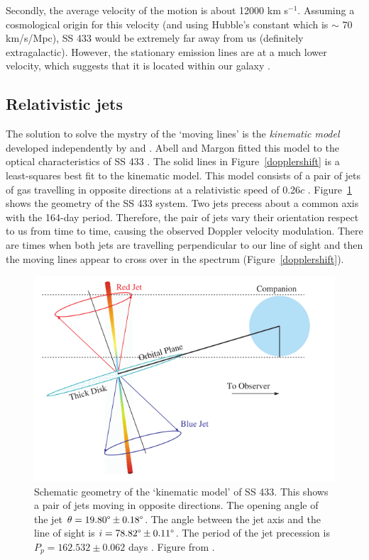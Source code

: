 Secondly, the average velocity of the motion is about 12000 km s$^{-1}$. Assuming a cosmological origin for this velocity (and using Hubble's constant which is $\sim$ 70 km/s/Mpc), SS 433 would be extremely far away from us (definitely extragalactic). However, the stationary emission lines are at a much lower velocity, which suggests that it is located within our galaxy \citep{seward_charles_2010}. 

\subsection{Relativistic jets}
The solution to solve the mystry of the `moving lines' is the \textit{kinematic model}
developed independently by \cite{Fabian1979} and \cite{Milgrom1979}. Abell and Margon fitted this model to the optical characteristics of SS 433 \citep{Margon1979}. The solid lines in Figure~\ref{dopplershift} is a least-squares best fit to the kinematic model. This model consists of a pair of jets of gas travelling in opposite directions at a relativistic speed of 0.26$c$ \citep{Margon1979}. Figure~\ref{geomtry_ss433} shows the geometry of the SS 433 system. Two jets precess about a common axis with the 164-day period. Therefore, the pair of jets vary their orientation respect to us from time to time, causing the observed Doppler velocity modulation. There are times when both jets are travelling perpendicular to our line of sight and then the moving lines appear to cross over in the spectrum (Figure~\ref{dopplershift}).\par 


\begin{figure}[ht]
    \centering
    \includegraphics[width = 0.7\linewidth]{Chapters/Figures/geometry_ss433.png}
    \caption{Schematic geometry of the `kinematic model' of SS 433. This shows a pair of jets moving in opposite directions. The opening angle of the jet $\theta=19.80\degree \pm 0.18\degree$. The angle between the jet axis and the line of sight is $i = 78.82\degree \pm0.11\degree$. The period of the jet precession is $P_p = 162.532 \pm 0.062$ days \citep{Margon1984}. Figure from \citep{Lopez2006}.}
    \label{geomtry_ss433}
\end{figure}

